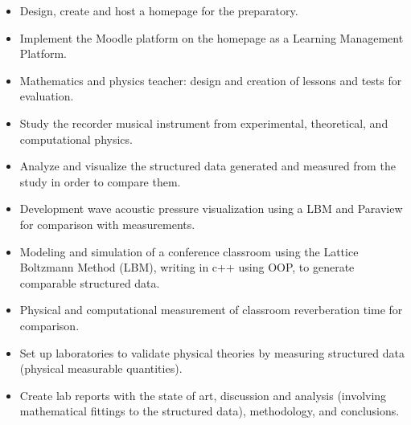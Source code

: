 \documentclass[10pt,letter,ragged2e,withhyper]{altacv}
\begin{document}
\begin{paracol}{2}
\divider

\begin{itemize}
\item Design, create and host a homepage for the preparatory.
\item Implement the Moodle platform on the homepage as a Learning Management Platform.
\item Mathematics and physics teacher: design and creation of lessons and tests for evaluation.
\end{itemize}

\divider

\begin{itemize}
\item Study the recorder musical instrument from experimental, theoretical, and computational physics.
\item Analyze and visualize the structured data generated and measured from the study in order to compare them.
\item Development wave acoustic pressure visualization using a LBM and Paraview for comparison with measurements.

\end{itemize}

\divider

\begin{itemize}
\item Modeling and simulation of a conference classroom using the Lattice Boltzmann Method (LBM), writing in c++ using OOP, to generate comparable structured data.
\item Physical and computational measurement of classroom reverberation time for comparison.
\end{itemize}

\divider

\begin{itemize}
\item Set up laboratories to validate physical theories by measuring structured data (physical measurable quantities).
\item Create lab reports with the state of art, discussion and analysis (involving mathematical fittings to the structured data), methodology, and conclusions.
\end{itemize}



\end{paracol}
\end{document}
